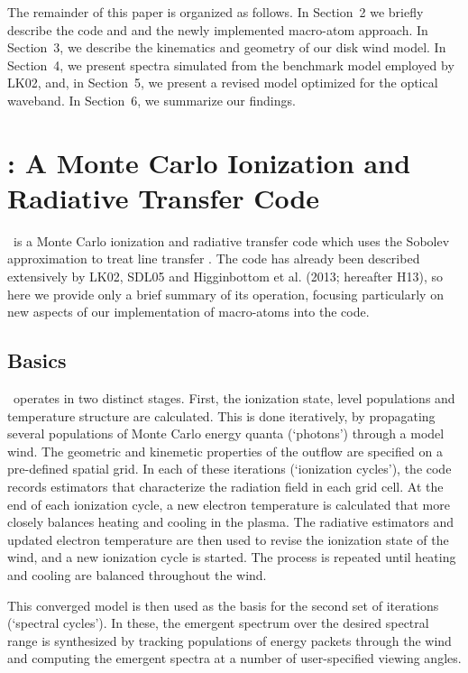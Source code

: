 \documentclass[preprint, a4paper, 11pt]{aastex}
\begin{document}
The remainder of this paper is organized as follows. In Section~2 we
briefly describe the code and and the newly implemented macro-atom
approach. In Section~3, we describe the kinematics and geometry of our
disk wind model. 
In Section~4, we present spectra simulated from the benchmark model
employed by LK02, and, in Section~5, we present a revised model
optimized for the optical waveband. In Section~6, we summarize our
findings.


%
%

\section{: A Monte Carlo Ionization and Radiative Transfer Code}

\py\ is a Monte Carlo  ionization and radiative transfer code which
uses the Sobolev approximation to treat line transfer 
\citep[e.g.][]{sobolev1957,sobolev1960,rybickihummer1978}. 
The code has already been described extensively by LK02, SDL05 and Higginbottom et al. (2013; hereafter H13), so here we provide only a brief summary of its operation, 
focusing particularly on new
aspects of our implementation of macro-atoms into the code. 

\subsection{Basics} 

\py\ operates in two distinct stages. First, the ionization state,
level populations and temperature structure are calculated. This is
done iteratively, by 
propagating several populations of Monte Carlo energy quanta (`photons')
through a model wind. The geometric and kinemetic properties of the
outflow are specified on a pre-defined spatial grid. In each of these
iterations (`ionization cycles'), the code records estimators that 
characterize the radiation field in each grid cell. At the end 
of each ionization cycle, a new electron temperature is calculated
that more closely balances heating and cooling in the 
plasma. The radiative estimators and updated electron
temperature are then used to revise the ionization state of the wind,
and a new ionization cycle is started. The process is repeated until
heating and cooling are balanced throughout the wind. 

This converged model is then used as the basis for the second set of
iterations (`spectral cycles'). In these, the emergent spectrum over
the desired spectral range is synthesized by tracking populations of
energy packets through the wind and computing the emergent spectra at
a number of user-specified viewing angles.  
\end{document}
